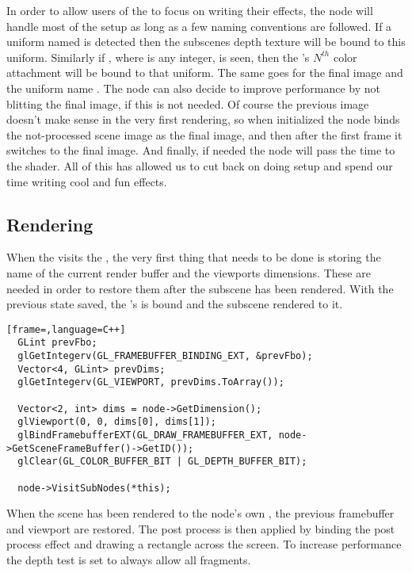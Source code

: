 In order to allow users of the  to focus on
writing their effects, the node will handle most of the setup as long
as a few naming conventions are followed. If a uniform named
 is detected then the subscenes depth texture will be
bound to this uniform. Similarly if , where  is
any integer, is seen, then the 's $N^{th}$ color
attachment will be bound to that uniform. The same goes for the final
image and the uniform name . The node can also
decide to improve performance by not blitting the final image, if this
is not needed. Of course the previous image doesn't make sense in the
very first rendering, so when initialized the node binds the
not-processed scene image as the final image, and then after the first
frame it switches to the final image. And finally, if needed the node
will pass the time to the shader. All of this has allowed us to cut
back on doing setup and spend our time writing cool and fun effects.

\subsection*{Rendering}


When the  visits the , the
very first thing that needs to be done is storing the name of the
current render buffer and the viewports dimensions. These are needed
in order to restore them after the subscene has been rendered. With
the previous state saved, the 's
 is bound and the subscene rendered to it.

\begin{lstlisting}[frame=,language=C++]
  GLint prevFbo;
  glGetIntegerv(GL_FRAMEBUFFER_BINDING_EXT, &prevFbo);
  Vector<4, GLint> prevDims;
  glGetIntegerv(GL_VIEWPORT, prevDims.ToArray());
  
  Vector<2, int> dims = node->GetDimension();
  glViewport(0, 0, dims[0], dims[1]);
  glBindFramebufferEXT(GL_DRAW_FRAMEBUFFER_EXT, node->GetSceneFrameBuffer()->GetID());
  glClear(GL_COLOR_BUFFER_BIT | GL_DEPTH_BUFFER_BIT);
  
  node->VisitSubNodes(*this);
\end{lstlisting}


When the scene has been rendered to the node's own
, the previous framebuffer and viewport are
restored. The post process is then applied by binding the post process
effect and drawing a rectangle across the screen. To increase
performance the depth test is set to always allow all fragments.

